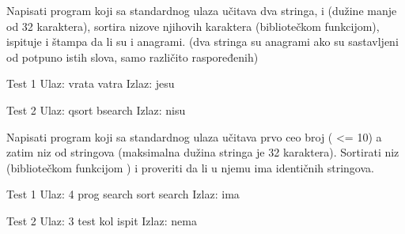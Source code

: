 \begin{Exercise}[label=521]
  Napisati program koji sa standardnog ulaza učitava dva stringa,
   i  (dužine manje od 32 karaktera), sortira nizove
  njihovih karaktera (bibliotečkom  funkcijom), ispituje
  i štampa da li su  i  anagrami. (dva stringa su
  anagrami ako su sastavljeni od potpuno istih slova, samo različito
  raspoređenih)
  
\begin{minitest}
\begin{test}{Test 1}
Ulaz:   vrata vatra
Izlaz:  jesu
\end{test}
\end{minitest}
\begin{miditest}
\begin{test}{Test 2}
Ulaz:   qsort bsearch
Izlaz:  nisu
\end{test}
\end{miditest}
  
\end{Exercise}

\begin{Exercise}[label=522]
  Napisati program koji sa standardnog ulaza učitava prvo ceo broj
   ( <= 10) a zatim niz  od  stringova
  (maksimalna dužina stringa je 32 karaktera). Sortirati niz 
  (bibliotečkom funkcijom ) i proveriti da li u njemu ima
  identičnih stringova.
  
\begin{miditest}
\begin{test}{Test 1}
Ulaz:   4 prog search sort search
Izlaz:  ima
\end{test}
\end{miditest}
\begin{miditest}
\begin{test}{Test 2}
Ulaz:   3 test kol ispit
Izlaz:  nema
\end{test}
\end{miditest}
  
\end{Exercise}

